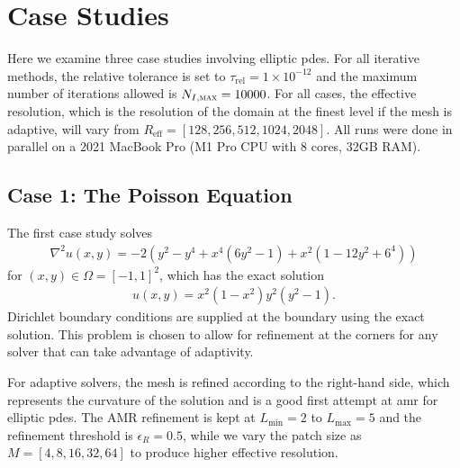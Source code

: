 \section{Case Studies}
\label{sec:case-studies}

Here we examine three case studies involving elliptic \gls{pdes}. For all iterative methods, the relative tolerance is set to $\tau_{\text{rel}} = 1 \times 10^{-12}$ and the maximum number of iterations allowed is $N_{I,\textsc{max}} = 10000$. For all cases, the effective resolution, which is the resolution of the domain at the finest level if the mesh is adaptive, will vary from $R_{\text{eff}} = [128, 256, 512, 1024, 2048]$. All runs were done in parallel on a 2021 MacBook Pro (M1 Pro CPU with 8 cores, 32GB RAM).

\subsection{Case 1: The Poisson Equation}
\label{sub:case01}

The first case study solves
\begin{align}
    \nabla^2 u(x,y) = -2(y^2 - y^4 + x^4(6y^2 - 1) + x^2 (1 - 12y^2 + 6^4))
\end{align}
for $(x,y) \in \Omega = [-1,1]^2$, which has the exact solution
\begin{align}
    u(x,y) = x^2 (1 - x^2) y^2 (y^2 - 1).
\end{align}
Dirichlet boundary conditions are supplied at the boundary using the exact solution. This problem is chosen to allow for refinement at the corners for any solver that can take advantage of adaptivity.

For adaptive solvers, the mesh is refined according to the right-hand side, which represents the curvature of the solution and is a good first attempt at \gls{amr} for elliptic \gls{pdes}. The AMR refinement is kept at $L_{\text{min}} = 2$ to $L_{\text{max}} = 5$ and the refinement threshold is $\epsilon_R = 0.5$, while we vary the patch size as $M = [4, 8, 16, 32, 64]$ to produce higher effective resolution.

